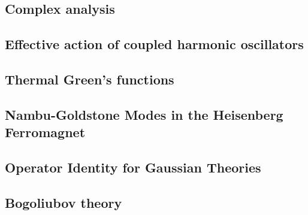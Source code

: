 \newpage
\setcounter{section}{5}
\setcounter{subsection}{0}
\subsection{Complex analysis}

\subsection{Effective action of coupled harmonic oscillators}





\newpage
\setcounter{section}{6}
\setcounter{subsection}{0}
\subsection{Thermal Green’s functions}

\subsection{Nambu-Goldstone Modes in the Heisenberg Ferromagnet}





\newpage
\setcounter{section}{7}
\setcounter{subsection}{0}
\subsection{Operator Identity for Gaussian Theories}


\newpage
\subsection{Bogoliubov theory}








\newpage
\setcounter{section}{8}
\setcounter{subsection}{0}
